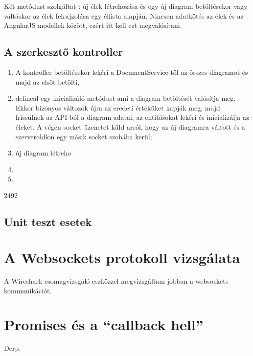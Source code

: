 Két metódust szolgáltat : új élek létrehozása és egy új diagram betöltésekor  vagy váltáskor az élek felrajzolása egy éllista alapján.
Nincsen adatkötés az élek és az AngularJS modellek között, ezért itt kell ezt megvalósítani.


\subsection{A szerkesztő kontroller}

\begin{enumerate}
\item A kontroller betöltésekor lekéri a DocumentService-től az összes diagramot és majd az elsőt betölti,
\item defineál egy inicializáló metódust ami a diagram betöltését valósítja meg. Ekkor bizonyos változók újra az eredeti értéküket kapják meg, majd frissülnek az API-ból a diagram adatai, az entitásokat lekéri és inicializálja az éleket. A végén socket üzenetet küld arról, hogy az új diagramra váltott és a szerveroldlon egy másik socket szobába kerül;
\item új diagram létreho
\item 
\item 
\end{enumerate}

2492

\subsection{Unit teszt esetek}










\section{A Websockets protokoll vizsgálata}

A Wireshark csomagvizsgáló eszközzel megvizsgáltam jobban a websockets kommunikációt.  




\section{Promises és a ``callback hell''}
Derp.


